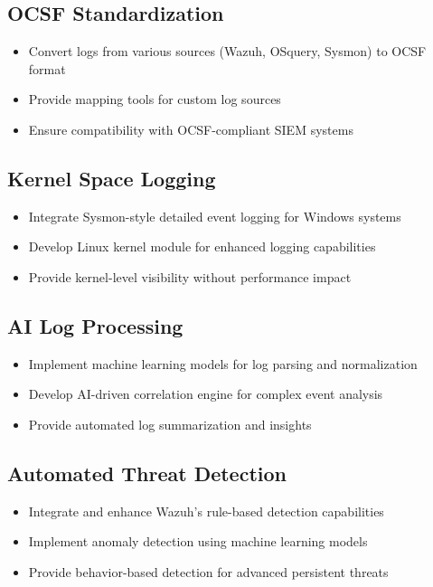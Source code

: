 \subsection{OCSF Standardization}
\begin{itemize}
    \item Convert logs from various sources (Wazuh, OSquery, Sysmon) to OCSF format
    \item Provide mapping tools for custom log sources
    \item Ensure compatibility with OCSF-compliant SIEM systems
\end{itemize}

\subsection{Kernel Space Logging}
\begin{itemize}
    \item Integrate Sysmon-style detailed event logging for Windows systems
    \item Develop Linux kernel module for enhanced logging capabilities
    \item Provide kernel-level visibility without performance impact
\end{itemize}

\subsection{AI Log Processing}
\begin{itemize}
    \item Implement machine learning models for log parsing and normalization
    \item Develop AI-driven correlation engine for complex event analysis
    \item Provide automated log summarization and insights
\end{itemize}

\subsection{Automated Threat Detection}
\begin{itemize}
    \item Integrate and enhance Wazuh's rule-based detection capabilities
    \item Implement anomaly detection using machine learning models
    \item Provide behavior-based detection for advanced persistent threats
\end{itemize}

